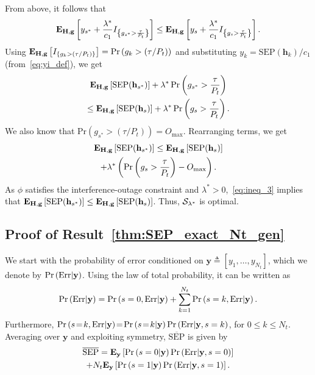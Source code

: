 \documentclass[journal]{IEEEtran}
\newcommand{\brac}[1]{\left({#1}\right)}
\newcommand{\cbrac}[1]{\left\{{#1}\right\}}
\newcommand{\indic}[1]{I_{\cbrac{#1}}}
\newcommand{\define}{\triangleq}
\newcommand{\mtx}[1]{{\bf #1}} %
\newcommand{\explow}[2]{{\bf{E}}_{#1}\left[{#2}\right]}
\newcommand{\prob}[1]{\text{Pr}\brac{#1}}
\newcommand{\given}{\arrowvert}
\newcommand{\SEP}{\text{SEP}}
\newcommand{\y}{\mathbf{y}}
\newcommand{\nx}{{0}}
\newcommand{\lam}{\lambda}
\newcommand{\lamstar}{\lam^{*}}
\newcommand{\sstar}{s^{*}}
\newcommand{\Err}{{\text{Err}}}
\newcommand{\Nt}{{N_t}}
\newcommand{\Pt}{{P_t}}
\newcommand{\such}{h}
\newcommand{\puch}{g}
\newcommand{\gk}[1]{{\puch_{#1}}}
\newcommand{\g}{\mathbf{\puch}}
\newcommand{\outmax}{O_{\text{max}}}
\newcommand{\itau}{\tau}
\newcommand{\cone}{c_{1}}
\newcommand{\taubypt}{\frac{\itau}{\Pt}}
\newcommand{\taubyptinl}{{\itau}/{\Pt}}
\newcommand{\gkgrtaubypt}[1]{{\gk{#1}}>\taubypt}
\newcommand{\gkgrtaubyptinl}[1]{{\gk{#1}}>\left( \taubyptinl \right) }
\newcommand{\gindic}[1]{\indic{\gkgrtaubypt{#1}}}
\newcommand{\gindicinl}[1]{\indic{\gkgrtaubyptinl{#1}}}
\newcommand{\yk}[1]{y_{#1}}
\newcommand{\Hmx}{\mtx{H}}
\newcommand{\callamstarrule}{\cal S_{\lam^{*}}}
\newcommand{\avgSEP}{\overline{\SEP}}
\newcommand{\hs}{\mathbf{\such}_{s}}
\newcommand{\bhk}[1]{\mathbf{\such}_{#1}}
\newcommand{\hsstar}{\mathbf{\such}_{s^{*}}}
\begin{document}
From above, it follows that   
\begin{equation}
\label{eq:opt_rul_1}  
   \explow{\Hmx,\g}{\yk{{\sstar}} + \frac{\lamstar}{\cone}\gindic{{\sstar}}} \leq  \explow{\Hmx,\g}{\yk{{s}} + \frac{\lamstar}{\cone}\gindic{{s}}}.
\end{equation}
%
%
Using $\explow{\Hmx,\g}{\gindicinl{k}}=\prob{\gkgrtaubyptinl{k}}$ and
substituting $\yk{k}={\SEP(\bhk{k})}/{\cone}$ (from~\eqref{eq:yi_def}), we get
%
\begin{multline}
\label{eq:opt_rul_2}
   \explow{\Hmx,\g}{\SEP(\hsstar)} + \lamstar \, \prob{\gkgrtaubypt{\sstar}} \\\leq  \explow{\Hmx,\g}{\SEP(\hs)} + \lamstar \, \prob{\gkgrtaubypt{s}}.
\end{multline}
%
We also know that $\prob{\gkgrtaubyptinl{\sstar}}=\outmax$. Rearranging terms, we get
%
\begin{multline}
\label{eq:ineq_3}
\explow{\Hmx,\g}{\SEP(\hsstar)} \leq \explow{\Hmx,\g}{\SEP(\hs)}\\ + \lamstar \left( \prob{\gkgrtaubypt{s}} -  \outmax \right).
\end{multline}
%
As $\phi$ satisfies the interference-outage constraint and $\lamstar>0$,~\eqref{eq:ineq_3} implies that $\explow{\Hmx,\g}{\SEP(\hsstar)} \leq \explow{\Hmx,\g}{\SEP(\hs)}$. Thus, $\callamstarrule$ is optimal.




\subsection{Proof of Result~\ref{thm:SEP_exact_Nt_gen}}
\label{proof:SEP_exact_Nt_gen}
We start with the probability of error conditioned on $\y \define [\yk{1},\ldots,\yk{\Nt}]$, which we denote by $\prob{\Err \given \y}$. Using the law of total probability, it can be written as
\begin{equation}
\prob{\Err \given \y} =  \prob{s=\nx,\Err\given\y} + \sum_{k=1}^{\Nt}\prob{s=k,\Err\given\y}.
\label{eq:Perr_all_h}
\end{equation}
%
Furthermore, $\prob{s\!=\!k,\Err\given\y}\!=\!\prob{s\!=\!k\given\y} \prob{\Err\given\y,s=k}$, for $0\leq k \leq \Nt$. Averaging over $\y$  and exploiting symmetry, $\avgSEP$ is given by
\begin{multline}
\label{eq:avg_SEP_1}
 \avgSEP = \explow{\y}{\prob{s=\nx\given\y}\prob{\Err\given\y,s=\nx}} \\+ \Nt\explow{\y}{\prob{s=1\given\y}\prob{\Err\given\y,s=1}}.
\end{multline}
\end{document}
